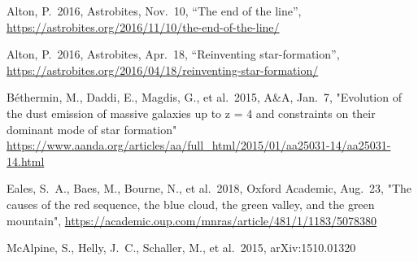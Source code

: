 \documentclass[linenumbers,trackchanges]{aastex7}
\begin{document}

\begin{thebibliography}{}

Alton, P.\ 2016, Astrobites, Nov.\ 10, “The end of the line”,  
\url{https://astrobites.org/2016/11/10/the-end-of-the-line/} 

Alton, P.\ 2016, Astrobites, Apr.\ 18, “Reinventing star-formation”,  
\url{https://astrobites.org/2016/04/18/reinventing-star-formation/} 

Béthermin, M., Daddi, E., Magdis, G., et al.\ 2015, A\&A, Jan.\ 7, "Evolution of the dust emission of massive galaxies up to z = 4 and constraints on their dominant mode of star formation"
\url{https://www.aanda.org/articles/aa/full_html/2015/01/aa25031-14/aa25031-14.html} 

Eales, S.~A., Baes, M., Bourne, N., et al.\ 2018, Oxford Academic, Aug.\ 23, "The causes of the red sequence, the blue cloud, the green valley, and the green mountain",
\url{https://academic.oup.com/mnras/article/481/1/1183/5078380} 

McAlpine, S., Helly, J.~C., Schaller, M., et al.\ 2015, arXiv:1510.01320

\end{thebibliography}




\end{document}
